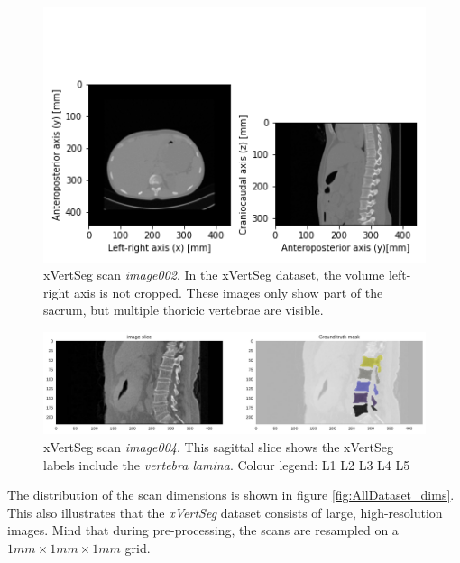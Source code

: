 \begin{figure}
    \centering
    \includegraphics[width=.95\textwidth]{automated_graphs/xVertSeg_image002.png}
    \caption{xVertSeg scan \textit{image002}. In the xVertSeg dataset, the volume left-right axis is not cropped. 
    These images only show part of the sacrum, but multiple thoricic vertebrae are visible.\label{fig:xVertSeg_image002}}
\end{figure}
\begin{figure}
    \centering
    \includegraphics[width=.95\textwidth]{images/xVertSeg004_s210_mask.pdf}
    \caption{\label{fig:xVertSeg004_s210_mask} xVertSeg scan \textit{image004}. This sagittal slice shows the xVertSeg labels include the \textit{vertebra lamina}.
    \newline\noindent Colour legend: \newline
\noindent{}  L1 %
\hspace{2mm}  L2 %
\hspace{2mm}  L3 %
\hspace{2mm}  L4 %
\hspace{2mm}  L5
    }
\end{figure}

The distribution of the scan dimensions is shown in figure \ref{fig:AllDataset_dims}. This also illustrates that the \textit{xVertSeg} dataset consists of large, high-resolution images.
Mind that during pre-processing, the scans are resampled on a $1mm \times 1mm \times 1mm$ grid.
